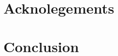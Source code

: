 \documentclass{InsightArticle}
\begin{document}
\section{Acknolegements}

\section{Conclusion}






% 

\appendix





\nocite{ITKSoftwareGuide}
\end{document}
